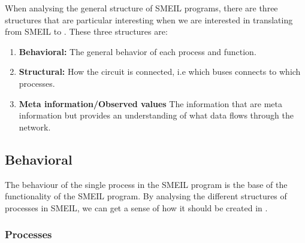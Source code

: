 When analysing the general structure of SMEIL programs, there are three structures that are particular interesting when we are interested in translating from SMEIL to \cspm{}. These three structures are:
\begin{enumerate}
    \item \textbf{Behavioral:} The general behavior of each process and function.
    \item \textbf{Structural:} How the circuit is connected, i.e which buses connects to which processes.
    \item \textbf{Meta information/Observed values} %
    The information that are meta information but provides an understanding of what data flows through the network.
\end{enumerate}


\subsection{Behavioral}
The behaviour of the single process in the SMEIL program is the base of the functionality of the SMEIL program. By analysing the different structures of processes in SMEIL, we can get a sense of how it should be created in \cspm.
\subsubsection{Processes}

